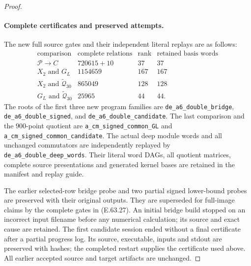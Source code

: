 \begin{proof}
\paragraph{Complete certificates and preserved attempts.}
The new full source gates and their independent
literal replays are as follows:
\[
 \begin{array}{l|r|r|l}
 \text{comparison}&\text{complete relations}&\text{rank}
                                      &\text{retained basis words}\\\hline
 \mathcal P\to C&720615+10&37&37\\
 X_2\text{ and }G_L&1154659&167&167\\
 X_2\text{ and }\widetilde{\mathcal Q}_{30}&865049&128&128\\
 G_L\text{ and }\widetilde{\mathcal Q}_{30}&25965&44&44.
 \end{array}
 \tag{E.63.27}
\]
The roots of the first three new program families
are \texttt{de\_a6\_double\_bridge},
\texttt{de\_a6\_double\_signed}, and
\texttt{de\_a6\_double\_candidate}.
The last comparison and the $900$-point quotient
are \texttt{a\_cm\_signed\_common\_GL} and
\texttt{a\_cm\_signed\_common\_candidate}.
The actual deep module words and all unchanged
commutators are independently replayed by
\texttt{de\_a6\_double\_deep\_words}.
Their literal word DAGs, all quotient matrices,
complete source presentations and generated
kernel bases are retained in the manifest and
replay guide.

The earlier selected-row bridge probe and two
partial signed lower-bound probes are preserved
with their original outputs. They are superseded
for full-image claims by the complete gates in
\textup{(E.63.27)}. An initial bridge build stopped
on an incorrect input filename before any numerical
calculation; its source and exact cause are retained.
The first candidate session ended without a final
certificate after a partial progress log. Its
source, executable, inputs and stdout are preserved
with hashes; the completed restart supplies the
certificate used above. All earlier accepted
source and target artifacts are unchanged.



\end{proof}
